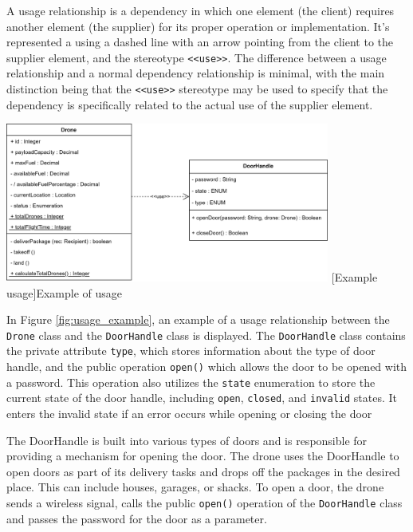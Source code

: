 \documentclass[
	12pt,
    a4paper,
    egregdoesnotlikesansseriftitles, %
    toc=chapterentrywithdots,
    oneside, openany,
    titlepage,
    parskip=half,
    headings=normal,  %
    listof=totoc,
    bibliography=totocnumbered,
    index=totoc,
    captions=tableheading,  %
    listof=flat,
    numbers=noenddot, %
    final]
    {scrbook}
\begin{document}
A usage relationship is a dependency in which one element (the client) requires another element (the supplier) for its proper operation or implementation. 
It's represented a using a dashed line with an arrow pointing from the client to the supplier element, and the stereotype \texttt{<<use>>}.
The difference between a usage relationship and a normal dependency relationship is minimal, with the main distinction being that the \texttt{<<use>>} stereotype may be used to specify that the dependency is specifically related to the actual use of the supplier element. \cite[p. 161]{uml}

\vspace{1em}
\begin{minipage}{\linewidth}
	\centering
	\includegraphics[width=0.8\textwidth]{figures/dependencies/usage.jpg}
	[Example usage]{Example of usage}
	\label{fig:usage_example}
\end{minipage}


In Figure \ref{fig:usage_example}, an example of a usage relationship between the \texttt{Drone} class and the \texttt{DoorHandle} class is displayed. The \texttt{DoorHandle} class contains the private attribute \texttt{type}, which stores information about the type of door handle, and the public operation \texttt{open()} which allows the door to be opened with a password.
This operation also utilizes the \texttt{state} enumeration to store the current state of the door handle, including \texttt{open}, \texttt{closed}, and \texttt{invalid} states.
It enters the invalid state if an error occurs while opening or closing the door

The DoorHandle is built into various types of doors and is responsible for providing a mechanism for opening the door. 
The drone uses the DoorHandle to open doors as part of its delivery tasks and drops off the packages in the desired place. 
This can include houses, garages, or shacks. 
To open a door, the drone sends a wireless signal, calls the public \texttt{open()} operation of the \texttt{DoorHandle} class and passes the password for the door as a parameter. 
 
\end{document}
